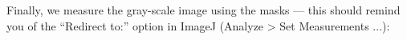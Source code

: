 Finally, we measure the gray-scale image using the masks --- this should remind you of the ``Redirect to:'' option in ImageJ (Analyze > Set Measurements ...):